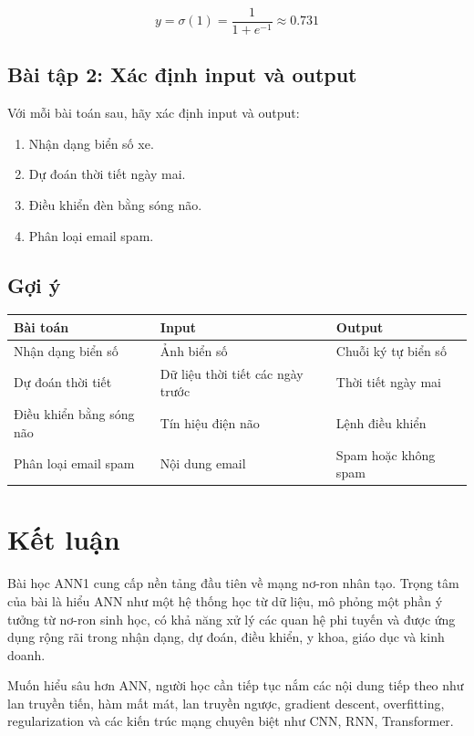 \[
    y = \sigma(1)=\frac{1}{1+e^{-1}}\approx 0.731
\]

\subsection*{Bài tập 2: Xác định input và output}

Với mỗi bài toán sau, hãy xác định input và output:

\begin{enumerate}
    \item Nhận dạng biển số xe.
    \item Dự đoán thời tiết ngày mai.
    \item Điều khiển đèn bằng sóng não.
    \item Phân loại email spam.
\end{enumerate}

\subsection*{Gợi ý}

\begin{center}
\begin{tabular}{lll}
\toprule
Bài toán & Input & Output \\
\midrule
Nhận dạng biển số & Ảnh biển số & Chuỗi ký tự biển số \\
Dự đoán thời tiết & Dữ liệu thời tiết các ngày trước & Thời tiết ngày mai \\
Điều khiển bằng sóng não & Tín hiệu điện não & Lệnh điều khiển \\
Phân loại email spam & Nội dung email & Spam hoặc không spam \\
\bottomrule
\end{tabular}
\end{center}

\section*{Kết luận}

Bài học ANN1 cung cấp nền tảng đầu tiên về mạng nơ-ron nhân tạo. Trọng tâm của bài là hiểu ANN như một hệ thống học từ dữ liệu, mô phỏng một phần ý tưởng từ nơ-ron sinh học, có khả năng xử lý các quan hệ phi tuyến và được ứng dụng rộng rãi trong nhận dạng, dự đoán, điều khiển, y khoa, giáo dục và kinh doanh.

Muốn hiểu sâu hơn ANN, người học cần tiếp tục nắm các nội dung tiếp theo như lan truyền tiến, hàm mất mát, lan truyền ngược, gradient descent, overfitting, regularization và các kiến trúc mạng chuyên biệt như CNN, RNN, Transformer.

